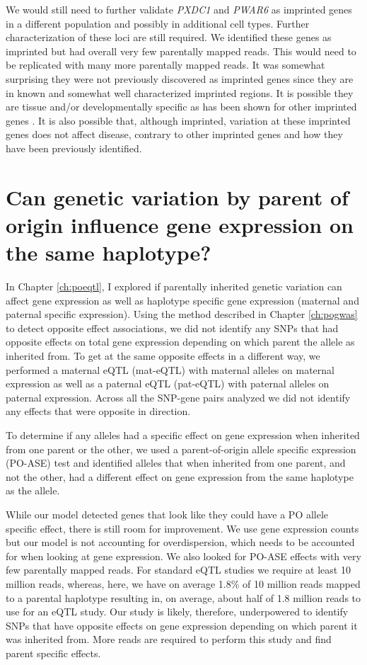 We would still need to further validate \emph{PXDC1} and \emph{PWAR6} as imprinted genes in a different population and possibly in additional cell types. Further characterization of these loci are still required. We identified these genes as imprinted but had overall very few parentally mapped reads. This would need to be replicated with many more parentally mapped reads. It was somewhat surprising they were not previously discovered as imprinted genes since they are in known and somewhat well characterized imprinted regions. It is possible they are tissue and/or developmentally specific as has been shown for other imprinted genes \cite{Baran:2015cx}.  It is also possible that, although imprinted, variation at these imprinted genes does not affect disease, contrary to other imprinted genes and how they have been previously identified. 

\section{Can genetic variation by parent of origin influence gene expression on the same haplotype?}

In Chapter \ref{ch:poeqtl}, I explored if parentally inherited genetic variation can affect gene expression as well as haplotype specific gene expression (maternal and paternal specific expression). Using the method described in Chapter \ref{ch:pogwas} to detect opposite effect associations, we did not identify any SNPs that had opposite effects on total gene expression depending on which parent the allele as inherited from. To get at the same opposite effects in a different way, we performed a maternal eQTL (mat-eQTL) with maternal alleles on maternal expression as well as a paternal eQTL (pat-eQTL) with paternal alleles on paternal expression. Across all the SNP-gene pairs analyzed we did not identify any effects that were opposite in direction. 

To determine if any alleles had a specific effect on gene expression when inherited from one parent or the other, we used a parent-of-origin allele specific expression (PO-ASE) test and identified alleles that when inherited from one parent, and not the other, had a different effect on gene expression from the same haplotype as the allele. 

While our model detected genes that look like they could have a PO allele specific effect, there is still room for improvement. We use gene expression counts but our model is not accounting for overdispersion, which needs to be accounted for when looking at gene expression. We also looked for PO-ASE effects with very few parentally mapped reads. For standard eQTL studies we require at least 10 million reads, whereas, here, we have on average 1.8\% of 10 million reads mapped to a parental haplotype resulting in, on average, about half of 1.8 million reads to use for an eQTL study. Our study is likely, therefore, underpowered to identify SNPs that have opposite effects on gene expression depending on which parent it was inherited from. More reads are required to perform this study and find parent specific effects. 
 
